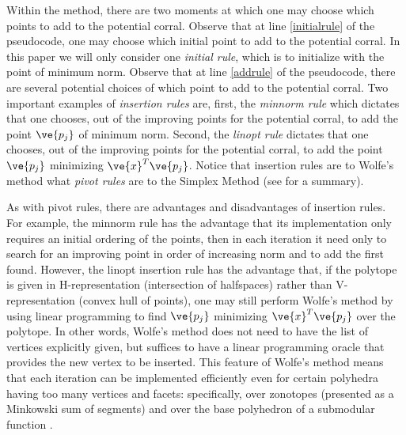 Within the method, there are two moments at which one may choose which points to add to the potential corral.  
Observe that at line \ref{initialrule} of the pseudocode, one may choose which initial point to add to the potential corral.  
In this paper we will only consider one \emph{initial rule}, which is to initialize with the point of minimum norm. 
Observe that at line \ref{addrule} of the pseudocode, there are several potential choices of which point to add to the potential corral. 
Two important examples of \emph{insertion rules} are, first, the \emph{minnorm rule} which dictates that one chooses, out of the improving points for the potential corral, to add the point $\ve{p_j}$ of minimum norm.  
Second, the \emph{linopt rule} dictates that one chooses, out of the improving points for the potential corral, to add the point $\ve{p_j}$ minimizing $\ve{x}^T \ve{p_j}$. Notice that insertion rules are to Wolfe's method what \emph{pivot rules} are to the Simplex Method (see \cite{Terlaky+Shuzhong1993} for a summary). 

As with pivot rules, there are advantages and disadvantages of insertion rules. 
For example, the minnorm rule has the advantage that its implementation only requires an initial ordering of the points, then in each iteration it need only to search for an improving point in order of increasing norm and to add the first found.  
However, the linopt insertion rule has the advantage that, if the polytope is given in H-representation (intersection of halfspaces) rather than V-representation (convex hull of points), one may still perform Wolfe's method by using linear programming to find $\ve{p_j}$ minimizing $ \ve{x}^T \ve{p_j}$ over the polytope. 
In other words, Wolfe's method does not need to have the list of vertices explicitly given, but suffices to have a linear programming oracle that provides the new vertex to be inserted.
This feature of Wolfe's method means that each iteration can be implemented efficiently even for certain polyhedra having too many vertices and facets: specifically, over zonotopes (presented as a Minkowski sum of segments) \cite{fuji2006} and over the base polyhedron of a submodular function \cite{fujishige80}.

